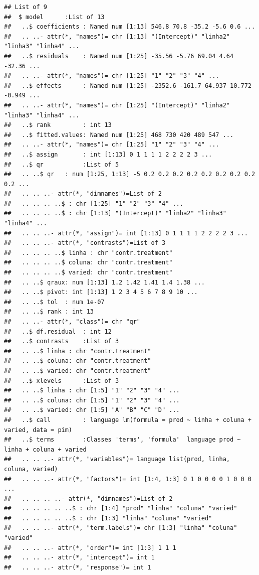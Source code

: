 \documentclass[
]{book}
\begin{document}
\begin{verbatim}
## List of 9
##  $ model      :List of 13
##   ..$ coefficients : Named num [1:13] 546.8 70.8 -35.2 -5.6 0.6 ...
##   .. ..- attr(*, "names")= chr [1:13] "(Intercept)" "linha2" "linha3" "linha4" ...
##   ..$ residuals    : Named num [1:25] -35.56 -5.76 69.04 4.64 -32.36 ...
##   .. ..- attr(*, "names")= chr [1:25] "1" "2" "3" "4" ...
##   ..$ effects      : Named num [1:25] -2352.6 -161.7 64.937 10.772 -0.949 ...
##   .. ..- attr(*, "names")= chr [1:25] "(Intercept)" "linha2" "linha3" "linha4" ...
##   ..$ rank         : int 13
##   ..$ fitted.values: Named num [1:25] 468 730 420 489 547 ...
##   .. ..- attr(*, "names")= chr [1:25] "1" "2" "3" "4" ...
##   ..$ assign       : int [1:13] 0 1 1 1 1 2 2 2 2 3 ...
##   ..$ qr           :List of 5
##   .. ..$ qr   : num [1:25, 1:13] -5 0.2 0.2 0.2 0.2 0.2 0.2 0.2 0.2 0.2 ...
##   .. .. ..- attr(*, "dimnames")=List of 2
##   .. .. .. ..$ : chr [1:25] "1" "2" "3" "4" ...
##   .. .. .. ..$ : chr [1:13] "(Intercept)" "linha2" "linha3" "linha4" ...
##   .. .. ..- attr(*, "assign")= int [1:13] 0 1 1 1 1 2 2 2 2 3 ...
##   .. .. ..- attr(*, "contrasts")=List of 3
##   .. .. .. ..$ linha : chr "contr.treatment"
##   .. .. .. ..$ coluna: chr "contr.treatment"
##   .. .. .. ..$ varied: chr "contr.treatment"
##   .. ..$ qraux: num [1:13] 1.2 1.42 1.41 1.4 1.38 ...
##   .. ..$ pivot: int [1:13] 1 2 3 4 5 6 7 8 9 10 ...
##   .. ..$ tol  : num 1e-07
##   .. ..$ rank : int 13
##   .. ..- attr(*, "class")= chr "qr"
##   ..$ df.residual  : int 12
##   ..$ contrasts    :List of 3
##   .. ..$ linha : chr "contr.treatment"
##   .. ..$ coluna: chr "contr.treatment"
##   .. ..$ varied: chr "contr.treatment"
##   ..$ xlevels      :List of 3
##   .. ..$ linha : chr [1:5] "1" "2" "3" "4" ...
##   .. ..$ coluna: chr [1:5] "1" "2" "3" "4" ...
##   .. ..$ varied: chr [1:5] "A" "B" "C" "D" ...
##   ..$ call         : language lm(formula = prod ~ linha + coluna + varied, data = pim)
##   ..$ terms        :Classes 'terms', 'formula'  language prod ~ linha + coluna + varied
##   .. .. ..- attr(*, "variables")= language list(prod, linha, coluna, varied)
##   .. .. ..- attr(*, "factors")= int [1:4, 1:3] 0 1 0 0 0 0 1 0 0 0 ...
##   .. .. .. ..- attr(*, "dimnames")=List of 2
##   .. .. .. .. ..$ : chr [1:4] "prod" "linha" "coluna" "varied"
##   .. .. .. .. ..$ : chr [1:3] "linha" "coluna" "varied"
##   .. .. ..- attr(*, "term.labels")= chr [1:3] "linha" "coluna" "varied"
##   .. .. ..- attr(*, "order")= int [1:3] 1 1 1
##   .. .. ..- attr(*, "intercept")= int 1
##   .. .. ..- attr(*, "response")= int 1

\end{verbatim}
\end{document}

